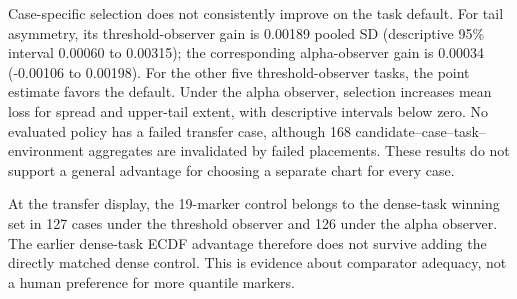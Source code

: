 Case-specific selection does not consistently improve on the task default. For tail asymmetry, its threshold-observer gain is 0.00189 pooled SD (descriptive 95\% interval 0.00060 to 0.00315); the corresponding alpha-observer gain is 0.00034 (-0.00106 to 0.00198). For the other five threshold-observer tasks, the point estimate favors the default. Under the alpha observer, selection increases mean loss for spread and upper-tail extent, with descriptive intervals below zero. No evaluated policy has a failed transfer case, although 168 candidate--case--task--environment aggregates are invalidated by failed placements. These results do not support a general advantage for choosing a separate chart for every case.

At the transfer display, the 19-marker control belongs to the dense-task winning set in 127 cases under the threshold observer and 126 under the alpha observer. The earlier dense-task ECDF advantage therefore does not survive adding the directly matched dense control. This is evidence about comparator adequacy, not a human preference for more quantile markers.
